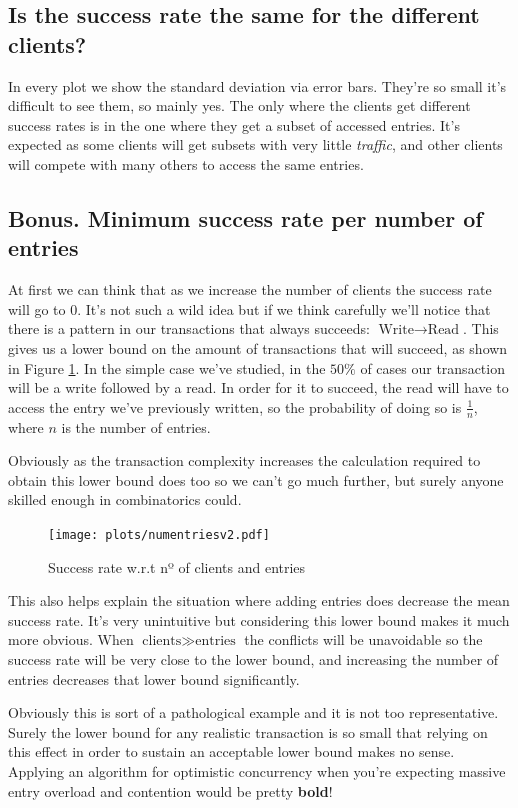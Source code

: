 \documentclass[a4paper, 10pt]{article}
\begin{document}
\subsection{Is the success rate the same for the different clients?}
In every plot we show the standard deviation via error bars. They're so small it's difficult to see them, so mainly yes. The only where the clients get different success rates is in the one where they get a subset of accessed entries. It's expected as some clients will get subsets with very little \textit{traffic}, and other clients will compete with many others to access the same entries.

\clearpage
\subsection{Bonus. Minimum success rate per number of entries}
\label{sec:magia}
At first we can think that as we increase the number of clients the success rate will go to $0$. It's not such a wild idea but if we think carefully we'll notice that there is a pattern in our transactions that always succeeds: $\text{Write} \rightarrow \text{Read}$. This gives us a lower bound on the amount of transactions that will succeed, as shown in Figure \ref{fig:magia}. In the simple case we've studied, in the $50\%$ of cases our transaction will be a write followed by a read. In order for it to succeed, the read will have to access the entry we've previously written, so the probability of doing so is $\frac{1}{n}$, where $n$ is the number of entries.

Obviously as the transaction complexity increases the calculation required to obtain this lower bound does too so we can't go much further, but surely anyone skilled enough in combinatorics could.
\begin{figure}[H]
  \centering
  \texttt{[image: plots/numentriesv2.pdf]}
    \caption{Success rate w.r.t nº of clients and entries}
    \label{fig:magia}
\end{figure} 

This also helps explain the situation where adding entries does decrease the mean success rate. It's very unintuitive but considering this lower bound makes it much more obvious. When $\text{clients} \gg \text{entries}$ the conflicts will be unavoidable so the success rate will be very close to the lower bound, and increasing the number of entries decreases that lower bound significantly.

Obviously this is sort of a pathological example and it is not too representative. Surely the lower bound for any realistic transaction is so small that relying on this effect in order to sustain an acceptable lower bound makes no sense. Applying an algorithm for optimistic concurrency when you're expecting massive entry overload and contention would be pretty \textbf{bold}!
\end{document}
